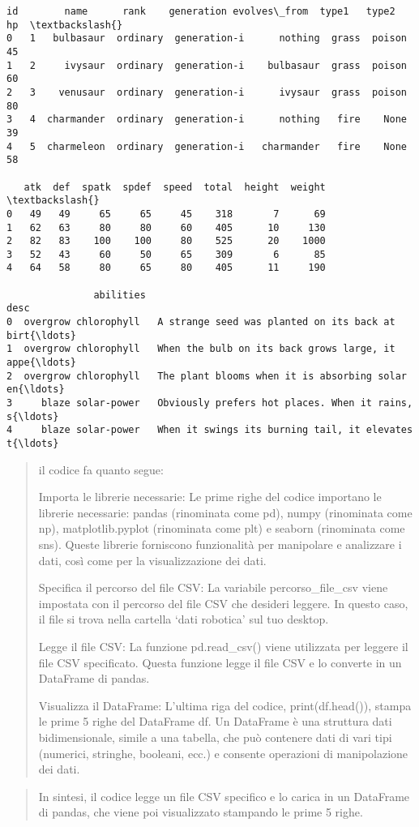 \documentclass[11pt]{article}
\begin{document}
    \begin{Verbatim}[commandchars=\\\{\}]
   id        name      rank    generation evolves\_from  type1   type2  hp  \textbackslash{}
0   1   bulbasaur  ordinary  generation-i      nothing  grass  poison  45
1   2     ivysaur  ordinary  generation-i    bulbasaur  grass  poison  60
2   3    venusaur  ordinary  generation-i      ivysaur  grass  poison  80
3   4  charmander  ordinary  generation-i      nothing   fire    None  39
4   5  charmeleon  ordinary  generation-i   charmander   fire    None  58

   atk  def  spatk  spdef  speed  total  height  weight  \textbackslash{}
0   49   49     65     65     45    318       7      69
1   62   63     80     80     60    405      10     130
2   82   83    100    100     80    525      20    1000
3   52   43     60     50     65    309       6      85
4   64   58     80     65     80    405      11     190

               abilities                                               desc
0  overgrow chlorophyll   A strange seed was planted on its back at birt{\ldots}
1  overgrow chlorophyll   When the bulb on its back grows large, it appe{\ldots}
2  overgrow chlorophyll   The plant blooms when it is absorbing solar en{\ldots}
3     blaze solar-power   Obviously prefers hot places. When it rains, s{\ldots}
4     blaze solar-power   When it swings its burning tail, it elevates t{\ldots}
    \end{Verbatim}

    \begin{quote}
il codice fa quanto segue:

Importa le librerie necessarie: Le prime righe del codice importano le
librerie necessarie: pandas (rinominata come pd), numpy (rinominata come
np), matplotlib.pyplot (rinominata come plt) e seaborn (rinominata come
sns). Queste librerie forniscono funzionalità per manipolare e
analizzare i dati, così come per la visualizzazione dei dati.

Specifica il percorso del file CSV: La variabile percorso\_file\_csv
viene impostata con il percorso del file CSV che desideri leggere. In
questo caso, il file si trova nella cartella `dati robotica' sul tuo
desktop.

Legge il file CSV: La funzione pd.read\_csv() viene utilizzata per
leggere il file CSV specificato. Questa funzione legge il file CSV e lo
converte in un DataFrame di pandas.

Visualizza il DataFrame: L'ultima riga del codice, print(df.head()),
stampa le prime 5 righe del DataFrame df. Un DataFrame è una struttura
dati bidimensionale, simile a una tabella, che può contenere dati di
vari tipi (numerici, stringhe, booleani, ecc.) e consente operazioni di
manipolazione dei dati.
\end{quote}

\begin{quote}
In sintesi, il codice legge un file CSV specifico e lo carica in un
DataFrame di pandas, che viene poi visualizzato stampando le prime 5
righe.
\end{quote}


    
    
    
\end{document}
